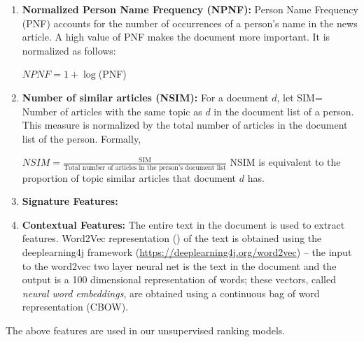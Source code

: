 \documentclass[a4paper,man,natbib]{apa6}
\begin{document}
\begin{itemize}
\begin{enumerate}
\item \textbf{ Normalized Person Name Frequency (NPNF): }
Person Name Frequency (PNF) accounts for the number of occurrences of a person's name in the news article. A high value of PNF makes the document more important. It is normalized as follows:

\begin{center}
$NPNF=	1+\log$(PNF)
\end{center}

\item \textbf{Number of similar articles (NSIM): }
For a document $d$, let  SIM= Number of articles with the same topic as $d$ in the document list of a person.
This measure is normalized by the total number of articles in the document list of the person. Formally,

$NSIM= \frac{\text{SIM}} {\text{Total number of articles in the person's document list}}$
NSIM is equivalent to the proportion of topic similar articles that document $d$ has.

\item \textbf{Signature Features: } %


\item \textbf{Contextual Features: } The entire text in the document is used to extract features. Word2Vec representation (\cite{Mikolov_13a, Mikolov_13b}) of the text is obtained using the deeplearning4j framework (\url{https://deeplearning4j.org/word2vec}) -- the input to the word2vec two layer neural net is the text in the document and the output is a 100 dimensional representation of words; these vectors, called \emph{neural word embeddings}, are obtained using a continuous bag of word representation (CBOW). 

\end{enumerate}
The above features are used in our unsupervised ranking models.



\end{itemize}
\end{document}
